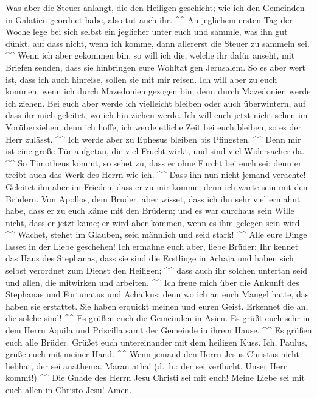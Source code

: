  Was aber die Steuer anlangt, die den Heiligen geschieht;
wie ich den Gemeinden in Galatien geordnet habe, also tut auch ihr.
\^{}\^{}  An jeglichem ersten Tag der Woche lege bei sich
selbst ein jeglicher unter euch und sammle, was ihn gut dünkt, auf dass
nicht, wenn ich komme, dann allererst die Steuer zu sammeln sei.
\^{}\^{}  Wenn ich aber gekommen bin, so will ich die,
welche ihr dafür anseht, mit Briefen senden, dass sie hinbringen eure
Wohltat gen Jerusalem.  So es aber wert ist, dass ich auch
hinreise, sollen sie mit mir reisen.  Ich will aber zu
euch kommen, wenn ich durch Mazedonien gezogen bin; denn durch
Mazedonien werde ich ziehen.  Bei euch aber werde ich
vielleicht bleiben oder auch überwintern, auf dass ihr mich geleitet, wo
ich hin ziehen werde.  Ich will euch jetzt nicht sehen im
Vorüberziehen; denn ich hoffe, ich werde etliche Zeit bei euch bleiben,
so es der Herr zulässt. \^{}\^{}  Ich werde aber zu
Ephesus bleiben bis Pfingsten. \^{}\^{}  Denn mir ist eine
große Tür aufgetan, die viel Frucht wirkt, und sind viel Widersacher da.
\^{}\^{}  So Timotheus kommt, so sehet zu, dass er ohne
Furcht bei euch sei; denn er treibt auch das Werk des Herrn wie ich.
\^{}\^{}  Dass ihn nun nicht jemand verachte! Geleitet
ihn aber im Frieden, dass er zu mir komme; denn ich warte sein mit den
Brüdern.  Von Apollos, dem Bruder, aber wisset, dass ich
ihn sehr viel ermahnt habe, dass er zu euch käme mit den Brüdern; und es
war durchaus sein Wille nicht, dass er jetzt käme; er wird aber kommen,
wenn es ihm gelegen sein wird. \^{}\^{}  Wachet, stehet
im Glauben, seid männlich und seid stark! \^{}\^{}  Alle
eure Dinge lasset in der Liebe geschehen!  Ich ermahne
euch aber, liebe Brüder: Ihr kennet das Haus des Stephanas, dass sie
sind die Erstlinge in Achaja und haben sich selbst verordnet zum Dienst
den Heiligen; \^{}\^{}  dass auch ihr solchen untertan
seid und allen, die mitwirken und arbeiten. \^{}\^{}  Ich
freue mich über die Ankunft des Stephanas und Fortunatus und Achaikus;
denn wo ich an euch Mangel hatte, das haben sie erstattet.
 Sie haben erquickt meinen und euren Geist. Erkennet die
an, die solche sind! \^{}\^{}  Es grüßen euch die
Gemeinden in Asien. Es grüßt euch sehr in dem Herrn Aquila und Priscilla
samt der Gemeinde in ihrem Hause. \^{}\^{}  Es grüßen
euch alle Brüder. Grüßet euch untereinander mit dem heiligen Kuss.
 Ich, Paulus, grüße euch mit meiner Hand. \^{}\^{}
 Wenn jemand den Herrn Jesus Christus nicht liebhat, der
sei anathema. Maran atha! (d.~h.: der sei verflucht. Unser Herr kommt!)
\^{}\^{}  Die Gnade des Herrn Jesu Christi sei mit euch!
 Meine Liebe sei mit euch allen in Christo Jesu! Amen.
